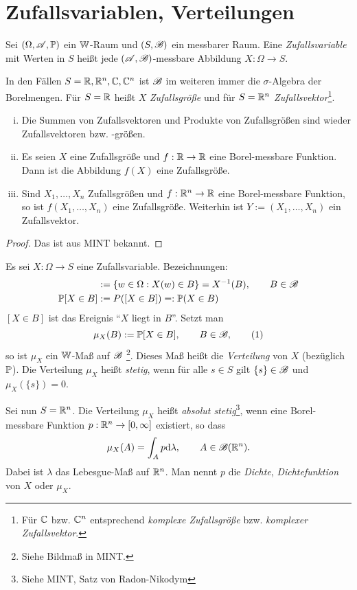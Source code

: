 \section{Zufallsvariablen, Verteilungen}
\begin{defn}
  Sei $(\Omega, \mathscr{A}, \mathbb{P})$ ein $\mathbb{W}$-Raum und $(S, \mathscr{B})$ ein messbarer Raum.
  Eine \emph{Zufallsvariable} mit Werten in $S$ heißt jede $(\mathscr{A}, \mathscr{B})$-messbare
  Abbildung $X: \Omega \to S$.

  In den Fällen $S = \mathbb{R}, \mathbb{R}^n, \mathbb{C}, \mathbb{C}^n$ ist $\mathscr{B}$ im weiteren
  immer die $\sigma$-Algebra der Borelmengen. Für $S = \mathbb{R}$ heißt $X$
  \emph{Zufallsgröße} und für $S =\mathbb{R}^n$ \emph{Zufallsvektor}\footnote{%
  Für $\mathbb{C}$ bzw. $\mathbb{C}^n$ entsprechend \emph{komplexe Zufallsgröße} bzw.
  \emph{komplexer Zufallsvektor}.}.
\end{defn}

\begin{thm}
  \begin{enumerate}[(i)]
  \item Die Summen von Zufallsvektoren und Produkte von Zufallsgrößen sind
    wieder Zufallsvektoren bzw. -größen.
  \item Es seien $X$ eine Zufallsgröße und $f:\mathbb{R} \to \mathbb{R}$ eine
    Borel-messbare Funktion. Dann ist die Abbildung $f(X)$ eine Zufallsgröße.
  \item Sind $X_1, \ldots, X_n$ Zufallsgrößen und $f: \mathbb{R}^n \to \mathbb{R}$
    eine Borel-messbare Funktion, so ist $f(X_1, \ldots, X_n)$ eine
    Zufallsgröße. Weiterhin ist $Y := (X_1, \ldots, X_n)$ ein Zufallsvektor.
  \end{enumerate}
\end{thm}

\begin{proof}
  Das ist aus MINT bekannt.
\end{proof}

\begin{defn}
  Es sei $X: \Omega \to S$ eine Zufallsvariable. Bezeichnungen:
  \begin{align*}
    [ X \in B ] &:= \{ w \in \Omega : X(w) \in B \} = X^{-1}(B), \qquad B \in \mB \\
    \pP[ X \in B ] &:= P([X \in B]) =: \pP(X \in B)
  \end{align*}
  $[X \in B]$ ist das Ereignis ``$X$ liegt in $B$''. Setzt man
  \[ \mu_X(B) := \mathbb{P}[ X \in B ], \qquad B \in \mathscr{B}, \tag{1} \]
  so ist $\mu_X$ ein $\mathbb{W}$-Maß auf $\mathscr{B}$ \footnote{%
    Siehe Bildmaß in MINT.}. Dieses Maß heißt die \emph{Verteilung} von $X$
  (bezüglich $\mathbb{P}$). Die Verteilung $\mu_X$ heißt \emph{stetig}, wenn für alle $s
  \in S$ gilt $\{s\} \in \mathscr{B}$ und $\mu_X(\{s\}) = 0$.

  Sei nun $S = \mathbb{R}^n$. Die Verteilung $\mu_X$ heißt \emph{absolut
    stetig}\footnote{%
    Siehe MINT, Satz von Radon-Nikodym}, wenn eine Borel-messbare Funktion $p :
  \mathbb{R}^n  \to [0,\infty]$ existiert, so dass
  \[ \mu_X(A) = \int_A p \mathrm{d} \lambda, \qquad A \in \mathscr{B}(\mathbb{R}^n). \]
  Dabei ist $\lambda$ das Lebesgue-Maß auf $\mathbb{R}^n$. Man nennt $p$ die
  \emph{Dichte}, \emph{Dichtefunktion} von $X$ oder $\mu_X$.
\end{defn}

